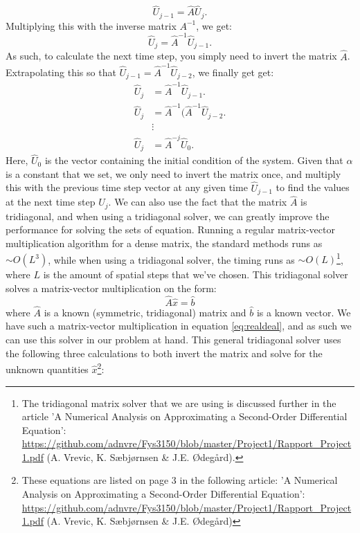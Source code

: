 \documentclass[reprint,english,notitlepage]{revtex4-1}  %
\begin{document}
\begin{equation}\label{eq:realdeal}
    \hat{U}_{j-1} = \hat{A}\hat{U}_{j}.
\end{equation}
Multiplying this with the inverse matrix $A^{-1}$, we get: 
\begin{equation}
    \hat{U}_j = \hat{A}^{-1} \hat{U}_{j-1}.
\end{equation}
As such, to calculate the next time step, you simply need to invert the matrix $\hat{A}$. Extrapolating this so that $\hat{U}_{j-1} = \hat{A}^{-1}\hat{U}_{j-2}$, we finally get get:
\begin{align*}
    \hat{U}_j &= \hat{A}^{-1}\hat{U}_{j-1}.\\
    \hat{U}_j &= \hat{A}^{-1}(\hat{A}^{-1}\hat{U}_{j-2}.\\
    &\vdots\\
    \hat{U}_j &= \hat{A}^{-j}\hat{U}_0.
\end{align*}
Here, $\hat{U}_0$ is the vector containing the initial condition of the system. Given that $\alpha$ is a constant that we set, we only need to invert the matrix once, and multiply this with the previous time step vector at any given time $\hat{U}_{j-1}$ to find the values at the next time step $\hat{U}_j$. We can also use the fact that the matrix $\hat{A}$ is tridiagonal, and when using a tridiagonal solver, we can greatly improve the performance for solving the sets of equation. Running a regular matrix-vector multiplication algorithm for a dense matrix, the standard methods runs as $\sim O(L^3)$, while when using a tridiagonal solver, the timing runs as $\sim O(L)$\footnote{The tridiagonal matrix solver that we are using is discussed further in the article 'A Numerical Analysis on Approximating a Second-Order Differential Equation': \url{https://github.com/adnvre/Fys3150/blob/master/Project1/Rapport_Project1.pdf} (A. Vrevic, K. Sæbjørnsen \& J.E. Ødegård).}, where $L$ is the amount of spatial steps that we've chosen. This tridiagonal solver solves a matrix-vector multiplication on the form:
\begin{equation}
    \hat{A}\hat{x} = \hat{b}
\end{equation}
where $\hat{A}$ is a known (symmetric, tridiagonal) matrix and $\hat{b}$ is a known vector. We have such a matrix-vector multiplication in equation \ref{eq:realdeal}, and as such we can use this solver in our problem at hand. This general tridiagonal solver uses the following three calculations to both invert the matrix and solve for the unknown quantities $\hat{x}$\footnote{These equations are listed on page 3 in the following article: 'A Numerical Analysis on Approximating a Second-Order Differential Equation’: \url{https://github.com/adnvre/Fys3150/blob/master/Project1/Rapport_Project1.pdf} (A. Vrevic, K. Sæbjørnsen & J.E. Ødegård)}:
\end{document}
